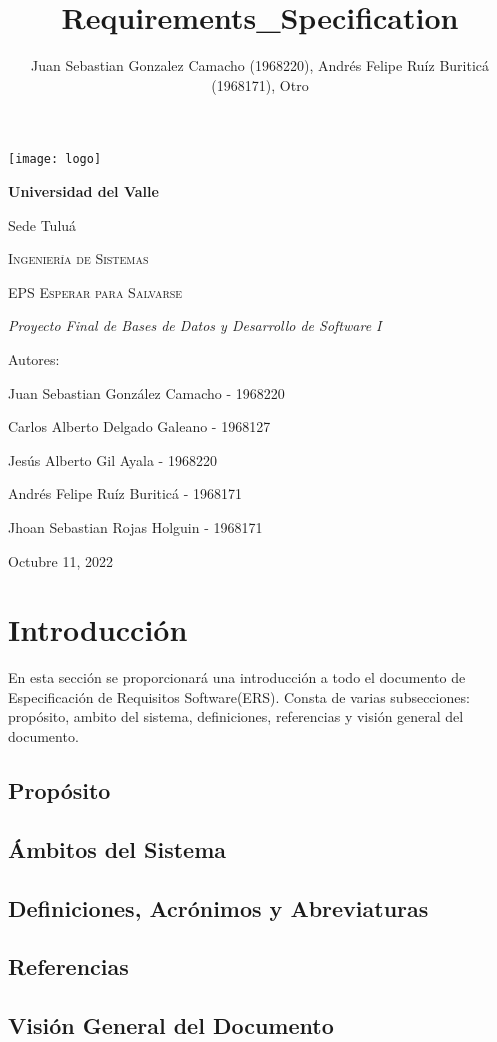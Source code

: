 \documentclass[12pt,a4paper]{article}
\author{Juan Sebastian Gonzalez Camacho (1968220), Andrés Felipe Ruíz Buriticá (1968171), Otro}
\title{Requirements_Specification}
\begin{document}
\begin{titlepage}
\centering
{\texttt{[image: logo]} \par}
\vfill
{\bfseries\LARGE Universidad del Valle\par}
{\Large Sede Tuluá\par}
\vfill
{\scshape\Large Ingeniería de Sistemas \par}
\vfill
{\scshape\Huge EPS Esperar para Salvarse \par}
\vfill
{\itshape\Large Proyecto Final de Bases de Datos y Desarrollo de Software I \par}
\vfill
{\Large Autores: \par}
{\Large Juan Sebastian González Camacho - 1968220 \par}
{\Large Carlos Alberto Delgado Galeano - 1968127 \par}
{\Large Jesús Alberto Gil Ayala - 1968220 \par}
{\Large Andrés Felipe Ruíz Buriticá - 1968171 \par}
{\Large Jhoan Sebastian Rojas Holguin - 1968171 \par}
\vfill
{\Large Octubre 11, 2022 \par}
\end{titlepage}
\tableofcontents
\newpage
\section{Introducción}
En esta sección se proporcionará una introducción a todo el documento de Especificación de Requisitos Software(ERS). Consta de varias subsecciones: propósito, ambito del sistema, definiciones, referencias y visión general del documento.
\subsection{Propósito}
\subsection{Ámbitos del Sistema}
\subsection{Definiciones, Acrónimos y Abreviaturas}
\subsection{Referencias}
\subsection{Visión General del Documento}
\end{document}
